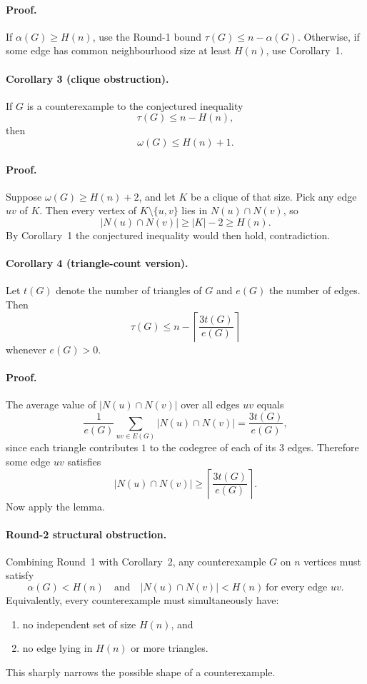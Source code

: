 \paragraph{Proof.}
If $\alpha(G)\ge H(n)$, use the Round-1 bound $\tau(G)\le n-\alpha(G)$. Otherwise, if some edge has common neighbourhood size at least $H(n)$, use Corollary~1.


\paragraph{Corollary 3 (clique obstruction).}
If $G$ is a counterexample to the conjectured inequality
\[
\tau(G)\le n-H(n),
\]
then
\[
\omega(G)\le H(n)+1.
\]

\paragraph{Proof.}
Suppose $\omega(G)\ge H(n)+2$, and let $K$ be a clique of that size. Pick any edge $uv$ of $K$. Then every vertex of $K\setminus\{u,v\}$ lies in $N(u)\cap N(v)$, so
\[
|N(u)\cap N(v)|\ge |K|-2\ge H(n).
\]
By Corollary~1 the conjectured inequality would then hold, contradiction.


\paragraph{Corollary 4 (triangle-count version).}
Let $t(G)$ denote the number of triangles of $G$ and $e(G)$ the number of edges. Then
\[
\tau(G)\le n-\left\lceil \frac{3t(G)}{e(G)}\right\rceil
\]
whenever $e(G)>0$.

\paragraph{Proof.}
The average value of $|N(u)\cap N(v)|$ over all edges $uv$ equals
\[
\frac{1}{e(G)}\sum_{uv\in E(G)} |N(u)\cap N(v)|
=
\frac{3t(G)}{e(G)},
\]
since each triangle contributes $1$ to the codegree of each of its $3$ edges. Therefore some edge $uv$ satisfies
\[
|N(u)\cap N(v)|\ge \left\lceil \frac{3t(G)}{e(G)}\right\rceil.
\]
Now apply the lemma.


\paragraph{Round-2 structural obstruction.}
Combining Round~1 with Corollary~2, any counterexample $G$ on $n$ vertices must satisfy
\[
\alpha(G)<H(n)
\quad\mbox{and}\quad
|N(u)\cap N(v)|<H(n)\ \mbox{for every edge }uv.
\]
Equivalently, every counterexample must simultaneously have:
\begin{enumerate}
\item no independent set of size $H(n)$, and
\item no edge lying in $H(n)$ or more triangles.
\end{enumerate}
This sharply narrows the possible shape of a counterexample.

